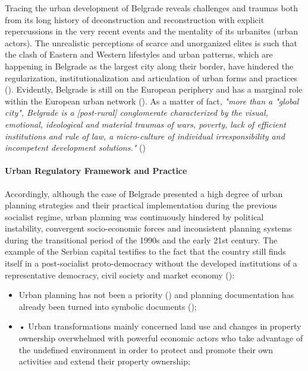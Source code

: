 \documentclass[11pt]{report}
\begin{document}
{{{{%
Tracing the urban development of Belgrade reveals challenges and traumas both from its long history of deconstruction and reconstruction with explicit repercussions in the very recent events and the mentality of its urbanites (urban actors). The unrealistic perceptions of scarce and unorganized elites is such that the clash of Eastern and Western lifestyles and urban patterns, which are happening in Belgrade as the largest city along their border, have hindered the regularization, institutionalization and articulation of urban forms and practices (\href{Samardzic}{\citealt{doytchinov_belgrade_2015}}).
Evidently, Belgrade is still on the European periphery and has a marginal role within the European urban network (\href{Vujovic}{\citealt{vujovic_belgrades_2007}}). 
As a matter of fact, \textit{"more  than  a  "global  city",  Belgrade  is  a  [post-rural]  conglomerate characterized by the visual, emotional, ideological and material traumas of wars, poverty, lack of efficient institutions and rule of law, a micro-culture of  individual  irresponsibility  and  incompetent  development  solutions."} (\href{Doytchinov}{\citealt{doytchinov_belgrade_2015}}) 
\\

\paragraph{Urban Regulatory Framework and Practice}

Accordingly, although the case of Belgrade presented a high degree of urban planning strategies and their practical implementation during the previous socialist regime, urban planning was continuously hindered by political instability, convergent socio-economic forces and inconsistent planning systems during the transitional period of the 1990s and the early 21st century. The example of the Serbian capital testifies to the fact that the country still finds itself in a post-socialist proto-democracy without the developed institutions of a representative democracy, civil society and market economy (\href{Vujosevic}{\citealt{vujosevic_collapse_2010}}):
 
\begin{itemize}
\item Urban planning has not been a priority (\href{Sykora}{\citealt{sykora_transitional_1999}}) and planning documentation has already been turned into symbolic documents (\href{Nedovic}{\citealt{nedovic-budic_adjustment_2001}});

\item •	Urban transformations mainly concerned land use and changes in property ownership overwhelmed with powerful economic actors who take advantage of the undefined environment in order to protect and promote their own activities and extend their property ownership;
 

\end{itemize}}}}}
\end{document}
